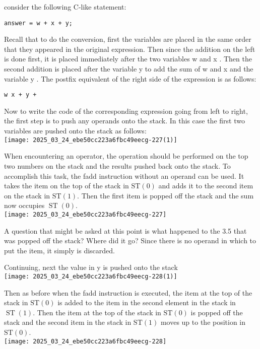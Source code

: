 \documentclass[10pt]{article}
\begin{document}
consider the following C-like statement:

\begin{verbatim}
answer = w + x + y;
\end{verbatim}

Recall that to do the conversion, first the variables are placed in the same order that they appeared in the original expression. Then since the addition on the left is done first, it is placed immediately after the two variables w and x . Then the second addition is placed after the variable y to add the sum of w and x and the variable y . The postfix equivalent of the right side of the expression is as follows:

\begin{verbatim}
w x + y +
\end{verbatim}

Now to write the code of the corresponding expression going from left to right, the first step is to push any operands onto the stack. In this case the first two variables are pushed onto the stack as follows:\\
\texttt{[image: 2025\_03\_24\_ebe50cc223a6fbc49eecg-227(1)]}

When encountering an operator, the operation should be performed on the top two numbers on the stack and the results pushed back onto the stack. To accomplish this task, the fadd instruction without an operand can be used. It takes the item on the top of the stack in $\mathrm{ST}(0)$ and adds it to the second item on the stack in $\mathrm{ST}(1)$. Then the first item is popped off the stack and the sum now occupies $\operatorname{ST}(0)$.\\
\texttt{[image: 2025\_03\_24\_ebe50cc223a6fbc49eecg-227]}

A question that might be asked at this point is what happened to the 3.5 that was popped off the stack? Where did it go? Since there is no operand in which to put the item, it simply is discarded.

Continuing, next the value in y is pushed onto the stack\\
\texttt{[image: 2025\_03\_24\_ebe50cc223a6fbc49eecg-228(1)]}

Then as before when the fadd instruction is executed, the item at the top of the stack in $\mathrm{ST}(0)$ is added to the item in the second element in the stack in $\operatorname{ST}(1)$. Then the item at the top of the stack in $\mathrm{ST}(0)$ is popped off the stack and the second item in the stack in $\mathrm{ST}(1)$ moves up to the position in $\mathrm{ST}(0)$.\\
\texttt{[image: 2025\_03\_24\_ebe50cc223a6fbc49eecg-228]}
\end{document}
